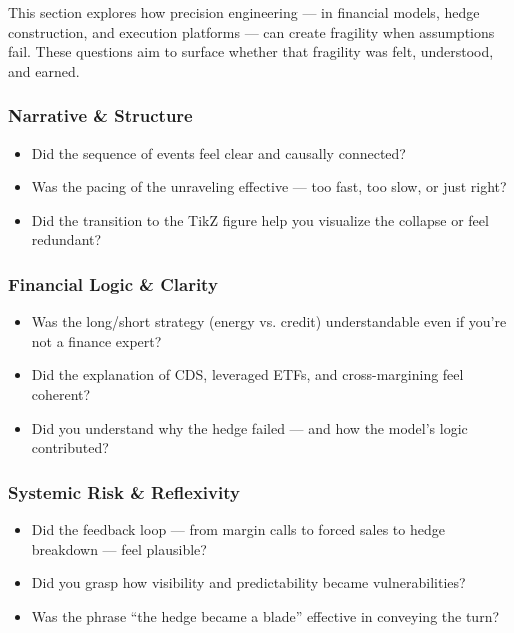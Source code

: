 This section explores how precision engineering — in financial models, hedge construction, and execution platforms — can create fragility when assumptions fail. These questions aim to surface whether that fragility was felt, understood, and earned.

\subsubsection{Narrative \& Structure}

\begin{itemize}
  \item Did the sequence of events feel clear and causally connected?
  \item Was the pacing of the unraveling effective — too fast, too slow, or just right?
  \item Did the transition to the TikZ figure help you visualize the collapse or feel redundant?
\end{itemize}

\subsubsection{Financial Logic \& Clarity}

\begin{itemize}
  \item Was the long/short strategy (energy vs. credit) understandable even if you’re not a finance expert?
  \item Did the explanation of CDS, leveraged ETFs, and cross-margining feel coherent?
  \item Did you understand why the hedge failed — and how the model's logic contributed?
\end{itemize}

\subsubsection{Systemic Risk \& Reflexivity}

\begin{itemize}
  \item Did the feedback loop — from margin calls to forced sales to hedge breakdown — feel plausible?
  \item Did you grasp how visibility and predictability became vulnerabilities?
  \item Was the phrase ``the hedge became a blade'' effective in conveying the turn?
\end{itemize}

